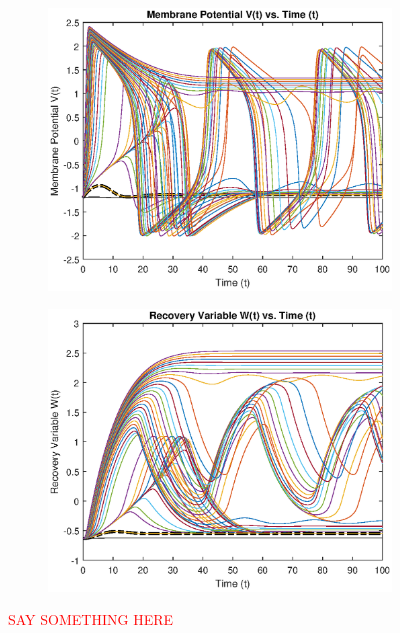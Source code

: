 \documentclass{book}
\theoremstyle{definition}
\begin{document}
 
\begin{figure}[!htb]
	\centering
	\begin{subfigure}{0.5\textwidth}
		\centering
		\includegraphics[scale=0.6]{FHN_lab/V_t_I_3.eps}
	\end{subfigure}%
	\begin{subfigure}{0.5\textwidth}
		\centering
		\includegraphics[scale=0.6]{FHN_lab/W_t_I_3.eps}
		
	\end{subfigure}%
	\caption{\textcolor{red}{SAY SOMETHING HERE}}
	\label{Fig:14}
\end{figure}
\end{document}
